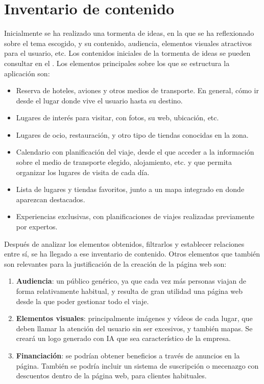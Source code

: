 \documentclass[11pt, a4paper]{book}
\begin{document}
	
	
	\section{Inventario de contenido}
	Inicialmente se ha realizado una tormenta de ideas, en la que se ha reflexionado sobre el tema escogido, y su contenido, audiencia, elementos visuales atractivos para el usuario, etc. Los contenidos iniciales de la tormenta de ideas se pueden consultar en el . Los elementos principales sobre los que se estructura la aplicación son:
	
	\begin{itemize}
		\item Reserva de hoteles, aviones y otros medios de transporte. En general, cómo ir desde el lugar donde vive el usuario hasta su destino.
		\item Lugares de interés para visitar, con fotos, su web, ubicación, etc. 
		\item Lugares de ocio, restauración, y otro tipo de tiendas conocidas en la zona.
		\item Calendario con planificación del viaje, desde el que acceder a la información sobre el medio de transporte elegido, alojamiento, etc. y que permita organizar los lugares de visita de cada día.
		\item Lista de lugares y tiendas favoritos, junto a un mapa integrado en donde aparezcan destacados.
		\item Experiencias exclusivas, con planificaciones de viajes realizadas previamente por expertos.
	\end{itemize} 
	
	Después de analizar los elementos obtenidos, filtrarlos y establecer relaciones entre sí, se ha llegado a ese inventario de contenido. Otros elementos que también son relevantes para la justificación de la creación de la página web son:
	
	\begin{enumerate}
		\item \textbf{Audiencia}: un público genérico, ya que cada vez más personas viajan de forma relativamente habitual, y resulta de gran utilidad una página web desde la que poder gestionar todo el viaje.
		\item \textbf{Elementos visuales}: principalmente imágenes y vídeos de cada lugar, que deben llamar la atención del usuario sin ser excesivos, y también mapas. Se creará un logo generado con IA que sea característico de la empresa.
		\item \textbf{Financiación}: se podrían obtener beneficios a través de anuncios en la página. También se podría incluir un sistema de suscripción o mecenazgo con descuentos dentro de la página web, para clientes habituales.
	\end{enumerate}
\end{document}
